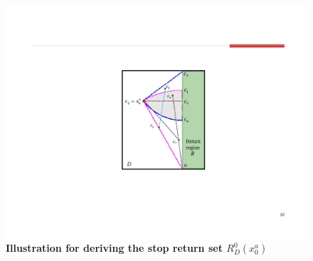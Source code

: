 \documentclass[letterpaper, 10 pt, conference]{ieeeconf}  %
\numberwithin{algorithm}{section}
\begin{document}
%

\begin{figure}[htbp]
	\centering
	\includegraphics[width=0.7\columnwidth]{figures/RD0}
	\caption{\textbf{Illustration for deriving the stop return set $R_D^0(x^a_0)$}}
	\label{fig:RD0}
\end{figure}
\end{document}
